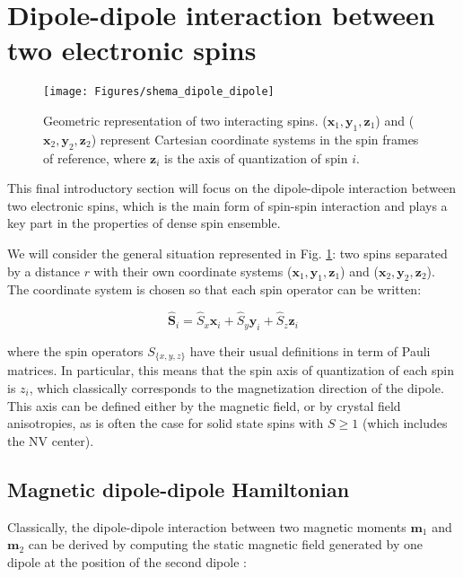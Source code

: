 \documentclass[a4paper,11pt]{report}
\begin{document}
\section{Dipole-dipole interaction between two electronic spins}

\begin{figure}[h!]
\centering
\texttt{[image: Figures/shema\_dipole\_dipole]}
\caption{Geometric representation of two interacting spins. ($\mathbf{x}_1,\mathbf{y}_1,\mathbf{z}_1$) and ($\mathbf{x}_2,\mathbf{y}_2,\mathbf{z}_2$) represent Cartesian coordinate systems in the spin frames of reference, where $\mathbf{z}_i$ is the axis of quantization of spin $i$.} 
\label{dipole-dipole}
\end{figure}

This final introductory section will focus on the dipole-dipole interaction between two electronic spins, which is the main form of spin-spin interaction and plays a key part in the properties of dense spin ensemble. 

We will consider the general situation represented in Fig. \ref{dipole-dipole}: two spins separated by a distance $r$ with their own coordinate systems ($\mathbf{x}_1,\mathbf{y}_1,\mathbf{z}_1$) and ($\mathbf{x}_2,\mathbf{y}_2,\mathbf{z}_2$). The coordinate system is chosen so that each spin operator can be written:

\begin{equation}
\hat{\mathbf{S}}_i=\hat{S}_x \mathbf{x}_i + \hat{S}_y \mathbf{y}_i + \hat{S}_z \mathbf{z}_i
\end{equation}

where the spin operators $S_{\{x,y,z\} }$ have their usual definitions in term of Pauli matrices. In particular, this means that the spin axis of quantization of each spin is $z_i$, which classically corresponds to the magnetization direction of the dipole. This axis can be defined either by the magnetic field, or by crystal field anisotropies, as is often the case for solid state spins with $S\geq 1$ (which includes the NV center).

\subsection{Magnetic dipole-dipole Hamiltonian}

Classically, the dipole-dipole interaction between two magnetic moments $\mathbf{m}_1$ and $\mathbf{m}_2$ can be derived by computing the static magnetic field generated by one dipole at the position of the second dipole \cite[p.~188]{jackson1999classical}:
\end{document}
